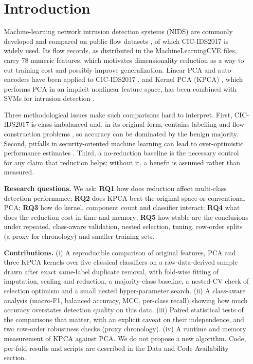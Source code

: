 \documentclass[conference,a4paper]{IEEEtran}
\begin{document}
\section{Introduction}
Machine-learning network intrusion detection systems (NIDS) are commonly developed and compared on public flow datasets \cite{ring2019}, of which CIC-IDS2017 \cite{sharafaldin2018} is widely used. Its flow records, as distributed in the MachineLearningCVE files, carry 78 numeric features, which motivates dimensionality reduction as a way to cut training cost and possibly improve generalization. Linear PCA and auto-encoders have been applied to CIC-IDS2017 \cite{abdulhammed2019}, and Kernel PCA (KPCA) \cite{scholkopf1998}, which performs PCA in an implicit nonlinear feature space, has been combined with SVMs for intrusion detection \cite{kuang2014}.

Three methodological issues make such comparisons hard to interpret. First, CIC-IDS2017 is class-imbalanced and, in its original form, contains labelling and flow-construction problems \cite{engelen2021,panigrahi2018}, so accuracy can be dominated by the benign majority. Second, pitfalls in security-oriented machine learning can lead to over-optimistic performance estimates \cite{arp2022}. Third, a no-reduction baseline is the necessary control for any claim that reduction helps; without it, a benefit is assumed rather than measured.

\textbf{Research questions.} We ask: \textbf{RQ1} how does reduction affect multi-class detection performance; \textbf{RQ2} does KPCA beat the original space or conventional PCA; \textbf{RQ3} how do kernel, component count and classifier interact; \textbf{RQ4} what does the reduction cost in time and memory; \textbf{RQ5} how stable are the conclusions under repeated, class-aware validation, nested selection, tuning, row-order splits (a proxy for chronology) and smaller training sets.

\textbf{Contributions.} (i) A reproducible comparison of original features, PCA and three KPCA kernels over five classical classifiers on a raw-data-derived sample drawn after exact same-label duplicate removal, with fold-wise fitting of imputation, scaling and reduction, a majority-class baseline, a nested-CV check of selection optimism and a small nested hyper-parameter search. (ii) A class-aware analysis (macro-F1, balanced accuracy, MCC, per-class recall) showing how much accuracy overstates detection quality on this data. (iii) Paired statistical tests of the comparisons that matter, with an explicit caveat on their independence, and two row-order robustness checks (proxy chronology). (iv) A runtime and memory measurement of KPCA against PCA. We do not propose a new algorithm. Code, per-fold results and scripts are described in the Data and Code Availability section.
\end{document}
